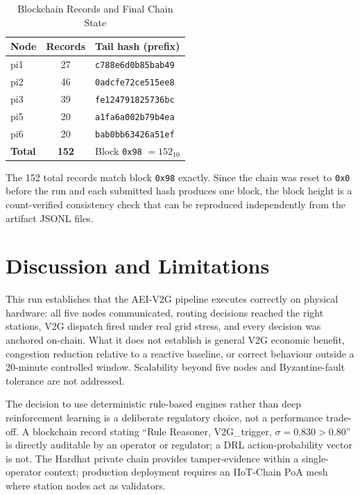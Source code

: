 \documentclass[journal,twoside,twocolumn]{IEEEtran}
\newcommand{\cmark}{\ding{51}}
\begin{document}
\begin{table}[!t]
\caption{Blockchain Records and Final Chain State}
\label{tab:chain}
\centering
\footnotesize
\renewcommand{\arraystretch}{1.15}
\begin{tabular}{@{}lcl@{}}
\toprule
\textbf{Node} & \textbf{Records} & \textbf{Tail hash (prefix)} \\
\midrule
pi1 & 27 & \texttt{c788e6d0b85bab49} \\
pi2 & 46 & \texttt{0adcfe72ce515ee8} \\
pi3 & 39 & \texttt{fe124791825736bc} \\
pi5 & 20 & \texttt{a1fa6a002b79b4ea} \\
pi6 & 20 & \texttt{bab0bb63426a51ef} \\
\midrule
\textbf{Total} & \textbf{152} & Block \texttt{0x98} $= 152_{10}$ \cmark \\
\bottomrule
\end{tabular}
\end{table}

The 152 total records match block \texttt{0x98} exactly. Since the chain was
reset to \texttt{0x0} before the run and each submitted hash produces one block,
the block height is a count-verified consistency check that can be reproduced
independently from the artifact JSONL files.

\section{Discussion and Limitations}
\label{sec:discuss}

This run establishes that the AEI-V2G pipeline executes correctly on physical
hardware: all five nodes communicated, routing decisions reached the right
stations, V2G dispatch fired under real grid stress, and every decision was
anchored on-chain. What it does not establish is general V2G economic benefit,
congestion reduction relative to a reactive baseline, or correct behaviour
outside a 20-minute controlled window. Scalability beyond five nodes and
Byzantine-fault tolerance are not addressed.

The decision to use deterministic rule-based engines rather than deep
reinforcement learning is a deliberate regulatory choice, not a performance
trade-off. A blockchain record stating ``Rule Reasoner, V2G\_trigger,
$\sigma = 0.830 > 0.80$'' is directly auditable by an operator or regulator;
a DRL action-probability vector is not. The Hardhat private chain provides
tamper-evidence within a single-operator context; production deployment requires
an IIoT-Chain PoA mesh where station nodes act as validators.
\end{document}
